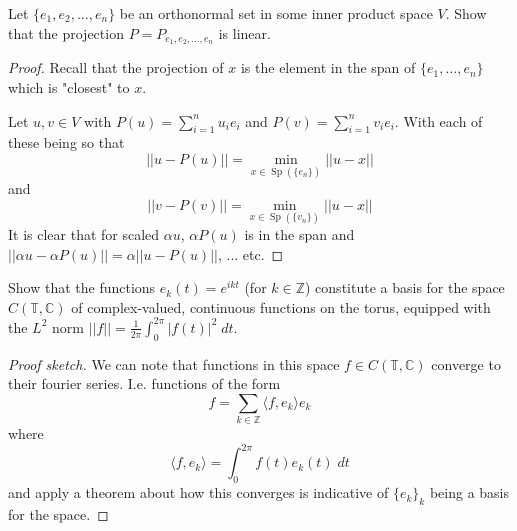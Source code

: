 \begin{prob}
    Let $\{e_1,e_2,\ldots,e_n\}$ be an orthonormal set in 
    some inner product space $V$. Show that the projection 
    $P = P_{e_1,e_2,\ldots,e_n}$ is linear.
\end{prob}
\begin{proof}
    Recall that the projection of $x$ is the element in the span of 
    $\{e_1,\ldots,e_n\}$ which is "closest" to $x$.  

    Let $u,v \in V$ with $P(u) = \sum_{i=1}^{n}u_ie_i$ and 
    $P(v) = \sum_{i=1}^{n}v_ie_i$. With each of these being so that 
    \[
        ||u - P(u)|| = \min_{x \in \operatorname{Sp}(\{e_n\})}||u-x||
    \]
    and 
    \[
        ||v - P(v)|| = \min_{x \in \operatorname{Sp}(\{v_n\})}||u-x||
    \]
    It is clear that for scaled $\alpha u$, $\alpha P(u)$ is in 
    the span and $||\alpha u - \alpha P(u)|| = \alpha||u-P(u)||$, 
    ... etc.
\end{proof}

\begin{prob}
    Show that the functions $e_k(t) = e^{ikt}$ (for $k \in \mathbb Z$)
    constitute a basis for the space $C(\mathbb T, \mathbb C)$
    of complex-valued, continuous functions on the torus, 
    equipped with the $L^2$ norm $||f|| = \frac{1}{2\pi}\int_0^{2\pi}
    |f(t)|^2\;dt$.
\end{prob}
\begin{proof}[Proof sketch]
    We can note that functions in this space $f \in C(\mathbb T, 
    \mathbb C)$ converge to their fourier series. I.e. functions of 
    the form 
    \[
        f = \displaystyle\sum_{k\in\mathbb Z} \langle f,e_k \rangle 
        e_k
    \]
    where 
    \[
        \langle f,e_k \rangle = \displaystyle\int_{0}^{2\pi}
        f(t)e_k(t)\; dt
    \]
    and apply a theorem about how this converges is indicative 
    of $\{e_k\}_k$ being a basis for the space.
\end{proof}

